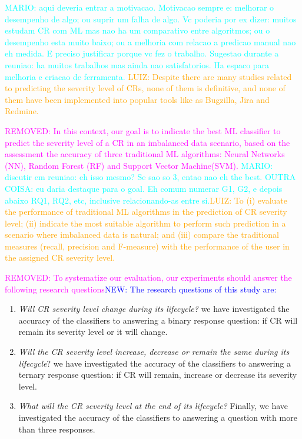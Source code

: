 \documentclass[10pt, conference]{IEEEtran}
\newcommand{\luiz}[1]{\noindent\textcolor{orange}{LUIZ: {#1}}}
\newcommand{\mario}[1]{\noindent\textcolor{cyan}{MARIO: {#1}}}
\newcommand{\rem}[1]{\noindent\textcolor{magenta}{REMOVED: {#1}}}
\newcommand{\new}[1]{\noindent\textcolor{blue}{NEW: {#1}}}
\newcommand{\luiz}[1]{}
\newcommand{\mario}[1]{}
\newcommand{\rem}[1]{}
\newcommand{\new}[1]{#1}
\begin{document}
\mario{aqui deveria entrar a motivacao. Motivacao sempre e: melhorar o desempenho de algo; ou suprir um falha de algo. Vc poderia por ex dizer: muitos estudam CR com ML mas nao ha um comparativo entre algoritmos; ou o desempenho esta muito baixo; ou a melhoria com relacao a predicao manual nao eh medida. E preciso justificar porque vc fez o trabalho. Sugestao durante a reuniao: ha muitos trabalhos mas ainda nao satisfatorios. Ha espaco para melhoria e criacao de ferramenta.}
\luiz{Despite there are many studies related to predicting the severity level of CRs, none of them is definitive, and none of them have been implemented into popular tools like as Bugzilla, Jira and Redmine.\cite{Cavalcanti2014}}

\rem{In this context, our goal is to indicate the best ML classifier to predict the severity level of a CR in an imbalanced data scenario, based on the assessment the accuracy of three traditional ML algorithms: Neural Networks (NN), Random Forest (RF) and Support Vector Machine(SVM).} \mario{discutir em reuniao: eh isso mesmo? Se sao so 3, entao nao eh the best. OUTRA COISA: eu daria destaque para o goal. Eh comum numerar G1, G2, e depois abaixo RQ1, RQ2, etc, inclusive relacionando-as entre si.}\luiz{To (i) evaluate the performance of traditional ML algorithms in the prediction of CR severity level; (ii) indicate the most suitable algorithm to perform such prediction in a scenario where imbalanced data is natural; and (iii) compare the traditional measures (recall, precision and F-measure) with the performance of the user in the assigned CR severity level.}

\rem{To systematize our evaluation, our experiments should answer the following research questions}\new{The research questions of this study are:}

\begin{enumerate}[RQ 1:]
  \item \textit{Will CR severity level change during its lifecycle?} we have investigated the accuracy of the classifiers to answering a binary response question: if CR will remain its severity level or it will change.
  \item \textit{Will the CR severity level increase, decrease or remain the same during its lifecycle}? we have investigated the accuracy of the classifiers to answering a ternary response question: if CR will remain, increase or decrease its severity level.
  \item \textit{What will the CR severity level at the end of its lifecycle?} Finally, we have investigated the accuracy of the classifiers to answering a question with more than three responses.
\end{enumerate}
\end{document}
